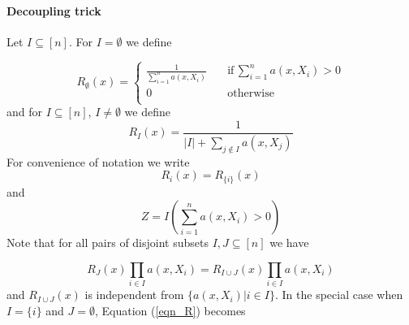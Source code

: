 \documentclass{article}
\begin{document}
\paragraph{Decoupling trick}

Let $I\subseteq [n]$.
For $I=\emptyset$ we define

\begin{equation}
\label{eqn_R_empty}
R_{\emptyset}(x)=\begin{cases}
    \frac{1}{\sum_{i=1}^n a(x,X_i)} \quad &\text{if}\, \sum_{i=1}^n a(x,X_i)>0\\
    0 \quad &\text{otherwise}\\
\end{cases}
\end{equation}
 and for $I\subseteq [n]$, $I\neq\emptyset$ we define  
\begin{equation*}
    R_I(x)=\frac{1}{|I|+\sum_{j\notin I}a(x,X_j)}
\end{equation*}
For convenience of notation we write
\begin{equation*}
    R_i(x)=R_{\{i\}}(x)
\end{equation*}
and 
\begin{equation}
\label{shorthand}
    Z=I(\sum_{i=1}^n a(x,X_i)>0)
\end{equation}
Note that for all pairs of disjoint subsets $I,J\subseteq [n]$ we have

\begin{equation}
\label{eqn_R}
R_J(x)\prod_{i\in I}a(x,X_i)=R_{I\cup J}(x)\prod_{i\in I}a(x,X_i)
\end{equation}
and $R_{I\cup J}(x)$ is independent from $\{a(x,X_i)|i\in I\}$. In the special case when $I=\{i\}$ and $J=\emptyset$, Equation (\ref{eqn_R}) becomes  
\end{document}
